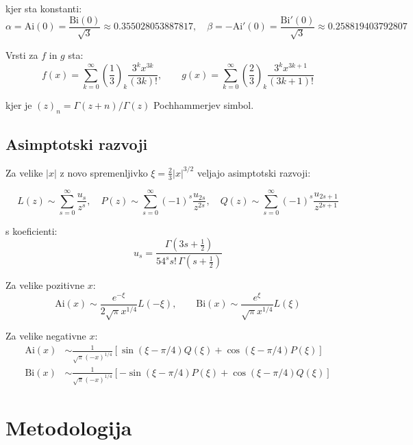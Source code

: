 \documentclass[12pt,a4paper]{article}
\newcommand{\Ai}{\mathrm{Ai}}
\newcommand{\Bi}{\mathrm{Bi}}
\begin{document}
kjer sta konstanti:
\begin{equation}
\alpha = \Ai(0) = \frac{\Bi(0)}{\sqrt{3}} \approx 0.355028053887817, \quad
\beta = -\Ai'(0) = \frac{\Bi'(0)}{\sqrt{3}} \approx 0.258819403792807
\end{equation}

Vrsti za $f$ in $g$ sta:
\begin{equation}
f(x) = \sum_{k=0}^\infty \left(\frac{1}{3}\right)_k \frac{3^k x^{3k}}{(3k)!}, \qquad
g(x) = \sum_{k=0}^\infty \left(\frac{2}{3}\right)_k \frac{3^k x^{3k+1}}{(3k+1)!}
\end{equation}

kjer je $(z)_n = \Gamma(z+n)/\Gamma(z)$ Pochhammerjev simbol.

\subsection{Asimptotski razvoji}
Za velike $|x|$ z novo spremenljivko $\xi = \frac{2}{3}|x|^{3/2}$ veljajo asimptotski razvoji:

\begin{equation}
L(z) \sim \sum_{s=0}^\infty \frac{u_s}{z^s}, \quad
P(z) \sim \sum_{s=0}^\infty (-1)^s \frac{u_{2s}}{z^{2s}}, \quad
Q(z) \sim \sum_{s=0}^\infty (-1)^s \frac{u_{2s+1}}{z^{2s+1}}
\end{equation}

s koeficienti:
\begin{equation}
u_s = \frac{\Gamma(3s + \frac{1}{2})}{54^s s! \, \Gamma(s + \frac{1}{2})}
\end{equation}

Za velike pozitivne $x$:
\begin{equation}
\Ai(x) \sim \frac{e^{-\xi}}{2\sqrt{\pi} x^{1/4}} L(-\xi), \qquad
\Bi(x) \sim \frac{e^{\xi}}{\sqrt{\pi} x^{1/4}} L(\xi)
\end{equation}

Za velike negativne $x$:
\begin{align}
\Ai(x) &\sim \frac{1}{\sqrt{\pi} (-x)^{1/4}} \left[\sin(\xi - \pi/4) Q(\xi) + \cos(\xi - \pi/4) P(\xi)\right] \\
\Bi(x) &\sim \frac{1}{\sqrt{\pi} (-x)^{1/4}} \left[-\sin(\xi - \pi/4) P(\xi) + \cos(\xi - \pi/4) Q(\xi)\right]
\end{align}

\section{Metodologija}
\end{document}
